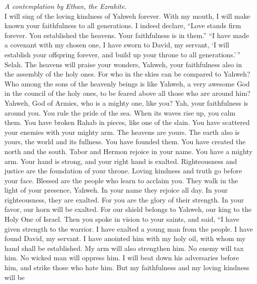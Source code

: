 \emph{A contemplation by Ethan, the Ezrahite.}\\
 I will sing of the loving kindness of Yahweh forever.
With my mouth, I will make known your faithfulness to all generations.
 I indeed declare, ``Love stands firm forever. You
established the heavens. Your faithfulness is in them.'' 
``I have made a covenant with my chosen one, I have sworn to David, my
servant,  `I will establish your offspring forever, and
build up your throne to all generations.'\,'' Selah.  The
heavens will praise your wonders, Yahweh, your faithfulness also in the
assembly of the holy ones.  For who in the skies can be
compared to Yahweh? Who among the sons of the heavenly beings is like
Yahweh,  a very awesome God in the council of the holy
ones, to be feared above all those who are around him? 
Yahweh, God of Armies, who is a mighty one, like you? Yah, your
faithfulness is around you.  You rule the pride of the
sea. When its waves rise up, you calm them.  You have
broken Rahab in pieces, like one of the slain. You have scattered your
enemies with your mighty arm.  The heavens are yours. The
earth also is yours, the world and its fullness. You have founded them.
 You have created the north and the south. Tabor and
Hermon rejoice in your name.  You have a mighty arm. Your
hand is strong, and your right hand is exalted. 
Righteousness and justice are the foundation of your throne. Loving
kindness and truth go before your face.  Blessed are the
people who learn to acclaim you. They walk in the light of your
presence, Yahweh.  In your name they rejoice all day. In
your righteousness, they are exalted.  For you are the
glory of their strength. In your favor, our horn will be exalted.
 For our shield belongs to Yahweh, our king to the Holy
One of Israel.  Then you spoke in vision to your saints,
and said, ``I have given strength to the warrior. I have exalted a young
man from the people.  I have found David, my servant. I
have anointed him with my holy oil,  with whom my hand
shall be established. My arm will also strengthen him. 
No enemy will tax him. No wicked man will oppress him.  I
will beat down his adversaries before him, and strike those who hate
him.  But my faithfulness and my loving kindness will be
